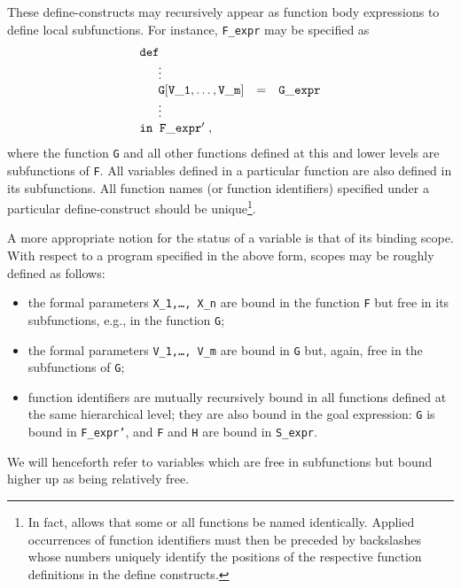 These {\sc define}-{\mys constructs}
may recursively appear as function body
expressions to define local subfunctions.
For instance, {\tt F\_expr} may be specified as
$$
\begin{array}{lcl}
{\tt def} \\
\phantom{{\sc in}\;\;}\vdots \\
\phantom{{\sc in}\;\;}{\tt G[V\_1, \ldots, V\_m]}&=&{\tt G\_expr} \\
\phantom{{\sc in}\;\;}\vdots \\
{\tt in}\;\; {\tt F\_expr'}\;,
\end{array}
$$
where the function {\tt G} and all other functions defined at this
and lower
levels are {\mys subfunctions}
of {\tt F}. All variables defined in a
particular function are also defined in its subfunctions.
All {\mys function names} (or {\mys function identifiers}) specified under a particular {\sc define}-construct
should be unique\footnote{ In fact, \pired allows that some or all functions be named 
identically. Applied occurrences of function identifiers must then be 
preceded
by backslashes whose numbers uniquely identify the positions of the respective
function definitions in the {\sc define} constructs.}.

\arraycolsep 5pt
A more appropriate notion for the status of a variable is
that of its {\mys binding scope}.
With respect to a program specified in the above form, scopes may
be roughly defined as follows:
\begin{itemize}
\item the
formal parameters {\tt X\_1,\ldots, X\_n} are {\mys bound}
in the function {\tt F} but {\mys free}
in its subfunctions, e.g., in the function {\tt G};
\item the formal parameters {\tt V\_1,\ldots, V\_m} are bound in
{\tt G} but, again, free in the subfunctions of {\tt G};
\item function identifiers are mutually recursively bound in all
functions defined at the same hierarchical level; they are
also bound in the goal expression: {\tt G} is bound in
{\tt F\_expr'}, and {\tt F} and {\tt H} are bound in {\tt S\_expr}.
\end{itemize}
We will henceforth refer to
variables which are free in subfunctions but bound higher up
as being {\mys relatively free}.

